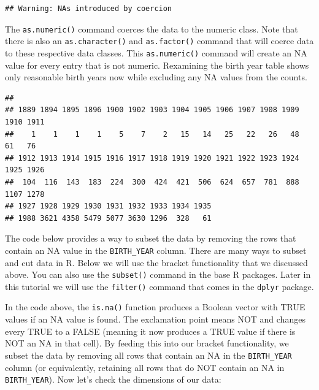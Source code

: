 \documentclass[]{book}
\newenvironment{Shaded}{\begin{snugshade}}{\end{snugshade}}
\newcommand{\KeywordTok}[1]{\textcolor[rgb]{0.13,0.29,0.53}{\textbf{{#1}}}}
\newcommand{\StringTok}[1]{\textcolor[rgb]{0.31,0.60,0.02}{{#1}}}
\newcommand{\CommentTok}[1]{\textcolor[rgb]{0.56,0.35,0.01}{\textit{{#1}}}}
\newcommand{\NormalTok}[1]{{#1}}
\begin{document}
\begin{verbatim}
## Warning: NAs introduced by coercion
\end{verbatim}

The \texttt{as.numeric()} command coerces the data to the numeric class.
Note that there is also an \texttt{as.character()} and
\texttt{as.factor()} command that will coerce data to these respective
data classes. This \texttt{as.numeric()} command will create an NA value
for every entry that is not numeric. Rexamining the birth year table
shows only reasonable birth years now while excluding any NA values from
the counts.

\begin{Shaded}
\end{Shaded}

\begin{verbatim}
## 
## 1889 1894 1895 1896 1900 1902 1903 1904 1905 1906 1907 1908 1909 1910 1911 
##    1    1    1    1    5    7    2   15   14   25   22   26   48   61   76 
## 1912 1913 1914 1915 1916 1917 1918 1919 1920 1921 1922 1923 1924 1925 1926 
##  104  116  143  183  224  300  424  421  506  624  657  781  888 1107 1278 
## 1927 1928 1929 1930 1931 1932 1933 1934 1935 
## 1988 3621 4358 5479 5077 3630 1296  328   61
\end{verbatim}

The code below provides a way to subset the data by removing the rows
that contain an NA value in the \texttt{BIRTH\_YEAR} column. There are
many ways to subset and cut data in R. Below we will use the bracket
functionality that we discussed above. You can also use the
\texttt{subset()} command in the base R packages. Later in this tutorial
we will use the \texttt{filter()} command that comes in the
\texttt{dplyr} package.

\begin{Shaded}
\end{Shaded}

In the code above, the \texttt{is.na()} function produces a Boolean
vector with TRUE values if an NA value is found. The exclamation point
means NOT and changes every TRUE to a FALSE (meaning it now produces a
TRUE value if there is NOT an NA in that cell). By feeding this into our
bracket functionality, we subset the data by removing all rows that
contain an NA in the \texttt{BIRTH\_YEAR} column (or equivalently,
retaining all rows that do NOT contain an NA in \texttt{BIRTH\_YEAR}).
Now let's check the dimensions of our data:
\end{document}
